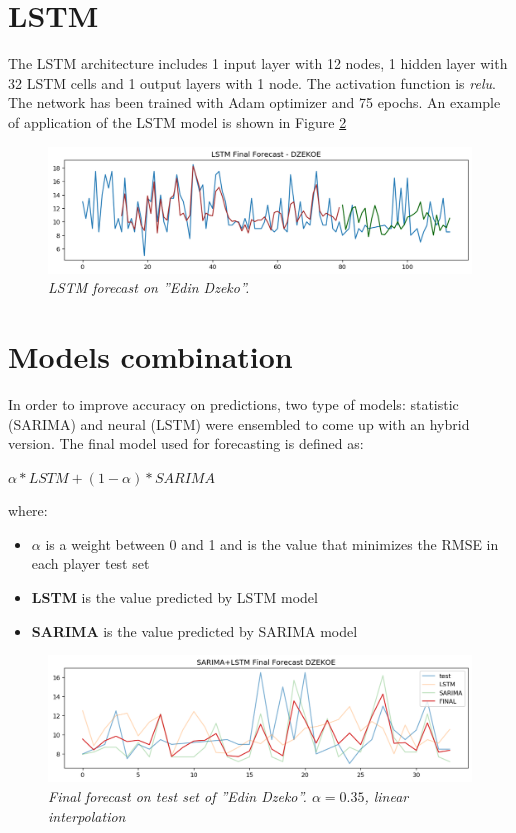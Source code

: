 \section{LSTM}
The LSTM architecture includes 1 input layer with 12 nodes, 1 hidden layer with 32 LSTM cells and 1 output layers with 1 node. The activation function is \textit{relu}.
The network has been trained with Adam optimizer and 75 epochs.
An example of application of the LSTM model is shown in Figure \ref{fig:mlp}
\begin{figure}[H]
  \includegraphics[scale=0.5]{images/dzeko_lstm_forecast.png}
   \centering  
   \caption{\textit{LSTM forecast on ''Edin Dzeko''.}}
  \label{fig:mlp}
\end{figure}


\section{Models combination}

In order to improve accuracy  on predictions, two type of models: statistic (SARIMA) and neural (LSTM)  were ensembled to come up with an hybrid version.
The final model used for forecasting is defined as:
\\
\begin{center}
  $\alpha * LSTM + (1 - \alpha) * SARIMA$
\end{center}
where:
\begin{itemize}
    \item \textbf{$\alpha$} is a weight between 0 and 1 and is the value that minimizes the RMSE in each player test set
    \item \textbf{LSTM} is the value predicted by LSTM model
    \item \textbf{SARIMA}  is the value predicted by SARIMA model 
\end{itemize}


\begin{figure}[H]
  \includegraphics[scale=0.5]{images/dzeko_sarima_lstm_forecast.png}
   \centering  
   \caption{\textit{Final forecast on test set of ''Edin Dzeko''. $\alpha  = 0.35$, \textit{linear interpolation}}}
  \label{fig:mlp}
\end{figure}




